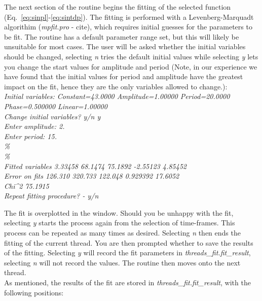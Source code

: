 \documentclass{article}
\begin{document}
The next section of the routine begins the fitting of the selected function (Eq.~\ref{eq:sinpl}-\ref{eq:sintdp}). The fitting is performed with a Levenberg-Marquadt algorithim 
(\textit{mpfit.pro} - cite), which requires initial guesses for the parameters to be fit. The routine has a default parameter range set, but this will likely be unsuitable for most 
cases. The user will be asked whether the initial variables should be changed, selecting \textit{n} tries the default initial values while selecting \textit{y} lets you change the start values for amplitude and period (Note, in our experience we have found that the initial values for period and amplitude have the greatest impact on the fit, hence they are the only variables allowed to change.):\\

 \textit{Initial variables: Constant=43.0000 Amplitude=1.00000 Period=20.0000 Phase=0.500000 Linear=1.00000\\
Change initial variables? y/n y\\
Enter amplitude: 2.\\
Enter period: 15.\\
\%\\
\%\\
Fitted variables      3.33458      68.1474      75.1892     -2.55123      4.85452\\
Error on fits      126.310      320.733      122.048     0.929392      17.6052\\
Chi\^{}2      75.1915\\
Repeat fitting procedure? - y/n \\
}

The fit is overplotted in the window. Should you be unhappy with the fit, selecting \textit{y} starts the process again from the selection of time-frames. This process can be 
repeated as many times as desired. Selecting \textit{n} then ends the fitting of the current thread. You are then prompted whether to save the results of the fitting. Selecting 
\textit{y} will record the fit parameters in \textit{threads\_fit.fit\_result},  selecting \textit{n} will not record the values. The routine then moves onto the next thread.\\

As mentioned, the results of the fit are stored in \textit{threads\_fit.fit\_result}, with the following positions:\\
\end{document}
